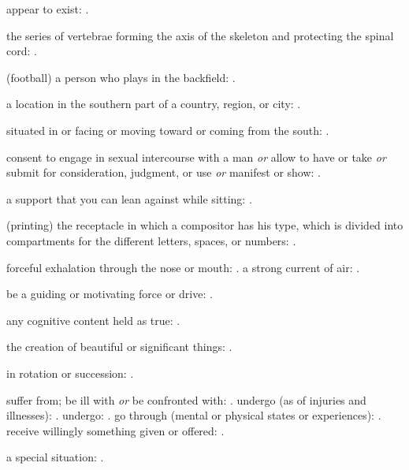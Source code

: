   appear to exist: .

  the series of vertebrae forming the axis of the skeleton and protecting the spinal cord:   .

  (football) a person who plays in the backfield: .

  a location in the southern part of a country, region, or city: .

  situated in or facing or moving toward or coming from the south: .

  consent to engage in sexual intercourse with a man \textit{or} allow to have or take \textit{or} submit for consideration, judgment, or use \textit{or} manifest or show: .

  a support that you can lean against while sitting:   .

  (printing) the receptacle in which a compositor has his type, which is divided into compartments for the different letters, spaces, or numbers:   .

  forceful exhalation through the nose or mouth:   . a strong current of air:   .

  be a guiding or motivating force or drive:   .

  any cognitive content held as true: .

  the creation of beautiful or significant things:   .

  in rotation or succession: .

  suffer from; be ill with \textit{or} be confronted with: . undergo (as of injuries and illnesses):   . undergo:   . go through (mental or physical states or experiences):   . receive willingly something given or offered:   .

  a special situation: .

